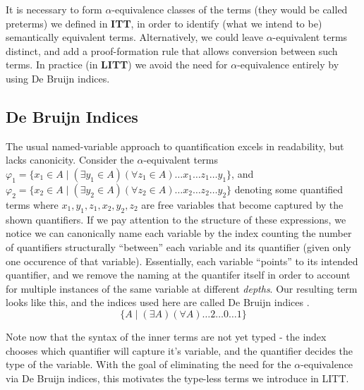 \documentclass[12pt,leqno]{article}
\newcommand{\ITT}{\textbf{ITT}}
\newcommand{\LITT}{\textbf{LITT}}
\theoremstyle{example}
\numberwithin{equation}{section}
\begin{document}
It is necessary to form $\alpha$-equivalence classes of the terms (they would be called preterms) we defined in \ITT, in order to identify (what we intend to be) semantically equivalent terms. Alternatively, we could leave $\alpha$-equivalent terms distinct, and add a proof-formation rule that allows conversion between such terms. In practice (in \LITT) we avoid the need for $\alpha$-equivalence entirely by using De Bruijn indices.

\subsection{De Bruijn Indices}

The usual named-variable approach to quantification excels in readability, but lacks canonicity. Consider the $\alpha$-equivalent terms $\varphi_1 = \{ x_1 \in A \mid (\exists y_1 \in A) (\forall z_1 \in A) \dots x_1 \dots z_1 \dots y_1 \}$, and $\varphi_2 = \{ x_2 \in A \mid (\exists y_2 \in A) (\forall z_2 \in A) \dots x_2 \dots z_2 \dots y_2 \}$ denoting some quantified terms where $x_1,y_1,z_1,x_2,y_2,z_2$ are free variables that become captured by the shown quantifiers. If we pay attention to the structure of these expressions, we notice we can canonically name each variable by the index counting the number of quantifiers structurally ``between'' each variable and its quantifier (given only one occurence of that variable). Essentially, each variable ``points'' to its intended quantifier, and we remove the naming at the quantifer itself in order to account for multiple instances of the same variable at different \emph{depths}. Our resulting term looks like this, and the indices used here are called De Bruijn indices \cite{pierce}.
\[\{ A \mid (\exists A) (\forall A) \dots 2 \dots 0 \dots 1 \}\]

Note now that the syntax of the inner terms are not yet typed - the index chooses which quantifier will capture it's variable, and the quantifier decides the type of the variable. With the goal of eliminating the need for the $\alpha$-equivalence via De Bruijn indices, this motivates the type-less terms we introduce in LITT.
\end{document}

